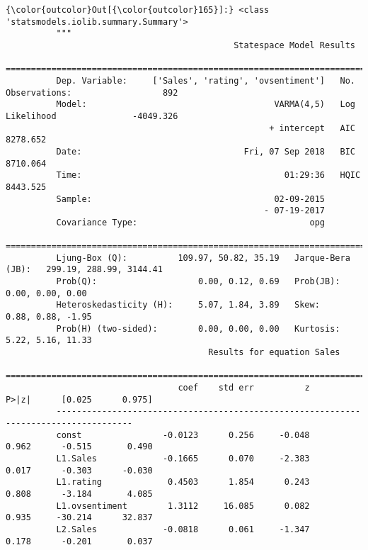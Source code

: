 \documentclass[11pt]{article}
\begin{document}
\begin{Verbatim}[commandchars=\\\{\}]
{\color{outcolor}Out[{\color{outcolor}165}]:} <class 'statsmodels.iolib.summary.Summary'>
          """
                                             Statespace Model Results                                   
          ==============================================================================================
          Dep. Variable:     ['Sales', 'rating', 'ovsentiment']   No. Observations:                  892
          Model:                                     VARMA(4,5)   Log Likelihood               -4049.326
                                                    + intercept   AIC                           8278.652
          Date:                                Fri, 07 Sep 2018   BIC                           8710.064
          Time:                                        01:29:36   HQIC                          8443.525
          Sample:                                    02-09-2015                                         
                                                   - 07-19-2017                                         
          Covariance Type:                                  opg                                         
          ==========================================================================================
          Ljung-Box (Q):          109.97, 50.82, 35.19   Jarque-Bera (JB):   299.19, 288.99, 3144.41
          Prob(Q):                    0.00, 0.12, 0.69   Prob(JB):                  0.00, 0.00, 0.00
          Heteroskedasticity (H):     5.07, 1.84, 3.89   Skew:                     0.88, 0.88, -1.95
          Prob(H) (two-sided):        0.00, 0.00, 0.00   Kurtosis:                 5.22, 5.16, 11.33
                                        Results for equation Sales                             
          =====================================================================================
                                  coef    std err          z      P>|z|      [0.025      0.975]
          -------------------------------------------------------------------------------------
          const                -0.0123      0.256     -0.048      0.962      -0.515       0.490
          L1.Sales             -0.1665      0.070     -2.383      0.017      -0.303      -0.030
          L1.rating             0.4503      1.854      0.243      0.808      -3.184       4.085
          L1.ovsentiment        1.3112     16.085      0.082      0.935     -30.214      32.837
          L2.Sales             -0.0818      0.061     -1.347      0.178      -0.201       0.037

\end{Verbatim}
\end{document}
